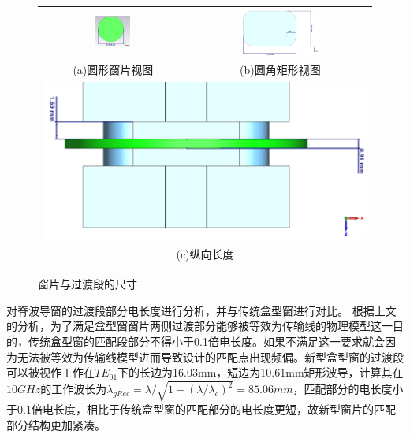\documentclass[master]{thesis-uestc}
\begin{document}
\begin{figure}[!htbp]
    \small
    \centering
    \begin{tabular}{@{\ }c@{\ }c}
        \includegraphics[width=0.25\textwidth]{pic/chapter3/圆形窗片视图.png} & 
        \hspace{5pt}
        \includegraphics[width=0.45\textwidth]{pic/chapter3/圆角矩形视图.png}     \\
        \mbox{\small (a)圆形窗片视图}                                                                               & 
        \mbox{\small (b)圆角矩形视图}                                                                                  \\[6bp]
        \multicolumn{2}{c}{\includegraphics[scale=0.21]{pic/chapter3/纵向长度视图.png}} \\  %
        \multicolumn{2}{c}{\mbox{\small (c)纵向长度}}
    \end{tabular}
    \caption{窗片与过渡段的尺寸}
    \label{fig:窗片与过渡段的尺寸}
\end{figure}

对脊波导窗的过渡段部分电长度进行分析，并与传统盒型窗进行对比。
根据上文的分析，为了满足盒型窗窗片两侧过渡部分能够被等效为传输线的物理模型这一目的，传统盒型窗的匹配段部分不得小于0.1倍电长度。如果不满足这一要求就会因为无法被等效为传输线模型进而导致设计的匹配点出现频偏。新型盒型窗的过渡段可以被视作工作在$TE_{01}$下的长边为16.03mm，短边为10.61mm矩形波导，计算其在$10GHz$的工作波长为$\lambda_{gRec}=\lambda / \sqrt{1-(\lambda / \lambda_c)^2}=85.06mm$，匹配部分的电长度小于0.1倍电长度，相比于传统盒型窗的匹配部分的电长度更短，故新型窗片的匹配部分结构更加紧凑。
\end{document}
